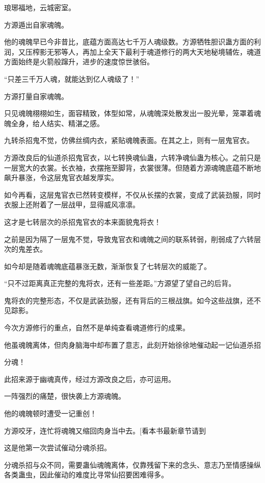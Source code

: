 
\begin{this_body}

琅琊福地，云城密室。

方源遁出自家魂魄。

他的魂魄早已今非昔比，底蕴方面高达七千万人魂级数。方源牺牲胆识蛊方面的利润，又压榨影无邪等人，再加上全天下最利于魂道修行的两大天地秘境辅佐，魂道方面始终是火箭般蹿升，进步的速度惊世骇俗。

“只差三千万人魂，就能达到亿人魂级了！”

方源打量自家魂魄。

只见魂魄栩栩如生，面容精致，体型如常，从魂魄深处散发出一股光晕，笼罩着魂魄全身，给人结实、精湛之感。

九转杀招鬼不觉，仿佛丝绸内衣，紧贴魂魄表面。在其之上，则有一层鬼官衣。

方源改良后的仙道杀招鬼官衣，以七转换魂仙蛊，六转净魂仙蛊为核心。之前只是一层宽大的衣裳。长衣袖，衣摆拖至脚背，衣裳很薄。但随着方源魂魄底蕴不断地飙升暴涨，令这层鬼官衣越发厚实。

如今再看，这层鬼官衣已然转变模样，不仅从长摆的衣裳，变成了武装劲服，同时衣服上还附着了一层战甲，显得威风凛凛。

这才是七转层次的杀招鬼官衣的本来面貌鬼将衣！

之前是因为隔了一层鬼不觉，导致鬼官衣和魂魄之间的联系转弱，削弱成了六转层次的鬼差衣。

如今却是随着魂魄底蕴暴涨无数，渐渐恢复了七转层次的威能了。

“只不过距离真正完整的鬼将衣，还有一些差距。”方源望了望自己的后背。

鬼将衣的完整形态，不仅是武装劲服，还有背后的三根战旗。如今这些战旗，还不见踪影。

今次方源修行的重点，自然不是单纯查看魂道修行的成果。

他虽魂魄离体，但肉身脑海中却布置了意志，此刻开始徐徐地催动起一记仙道杀招

分魂！

此招来源于幽魂真传，经过方源改良之后，亦可运用。

一阵强烈的痛楚，很快袭上方源魂魄。

他的魂魄顿时遭受一记重创！

方源咬牙，连忙将魂魄又缩回肉身当中去。[看本书最新章节请到

这是他第一次尝试催动分魂杀招。

分魂杀招与众不同，需要蛊仙魂魄离体，仅靠残留下来的念头、意志乃至情感操纵各类蛊虫，因此催动的难度比寻常仙招要困难得多。


\end{this_body}
